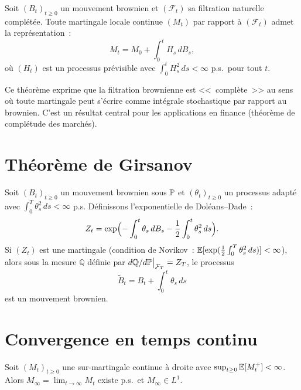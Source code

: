 \begin{theoreme}
\label{thm:representation}
Soit $(B_t)_{t \geq 0}$ un mouvement brownien et $(\mathcal{F}_t)$ sa filtration
naturelle compl\'et\'ee. Toute martingale locale continue $(M_t)$ par rapport \`a
$(\mathcal{F}_t)$ admet la repr\'esentation~:
\[
  M_t = M_0 + \int_0^t H_s \, dB_s,
\]
o\`u $(H_t)$ est un processus pr\'evisible avec $\int_0^t H_s^2 \, ds < \infty$
p.s.\ pour tout $t$.
\end{theoreme}

\begin{intuition}[title=\textbf{Compl\'etude de la filtration brownienne}]
Ce th\'eor\`eme exprime que la filtration brownienne est <<~compl\`ete~>> au sens
o\`u toute martingale peut s'\'ecrire comme int\'egrale stochastique par rapport
au brownien. C'est un r\'esultat central pour les applications en finance
(th\'eor\`eme de compl\'etude des march\'es).
\end{intuition}

\section{Th\'eor\`eme de Girsanov}

\begin{theoreme}[Girsanov]
\label{thm:girsanov}
Soit $(B_t)_{t \geq 0}$ un mouvement brownien sous $\mathbb{P}$ et $(\theta_t)_{t \geq 0}$
un processus adapt\'e avec $\int_0^T \theta_s^2 \, ds < \infty$ p.s. D\'efinissons
l'exponentielle de Dol\'eans--Dade~:
\[
  Z_t = \exp\Bigl(-\int_0^t \theta_s \, dB_s - \frac{1}{2} \int_0^t \theta_s^2 \, ds\Bigr).
\]
Si $(Z_t)$ est une martingale (condition de Novikov~:
$\mathbb{E}[\exp(\frac{1}{2}\int_0^T \theta_s^2 \, ds)] < \infty$), alors sous la mesure
$\mathbb{Q}$ d\'efinie par $d\mathbb{Q}/d\mathbb{P}\big|_{\mathcal{F}_T} = Z_T$, le
processus
\[
  \tilde{B}_t = B_t + \int_0^t \theta_s \, ds
\]
est un mouvement brownien.
\end{theoreme}

\section{Convergence en temps continu}

\begin{theoreme}
\label{thm:convergence_continue}
Soit $(M_t)_{t \geq 0}$ une sur-martingale continue \`a droite avec
$\sup_{t \geq 0} \mathbb{E}[M_t^+] < \infty$. Alors $M_{\infty} = \lim_{t \to \infty} M_t$
existe p.s.\ et $M_{\infty} \in L^1$.
\end{theoreme}

